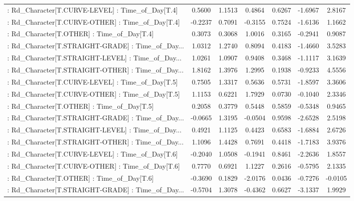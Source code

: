 \begin{longtable}{p{4cm}cccccc}
 : Rd\_Character[T.CURVE-LEVEL] : Time\_of\_Day[T.4]  &  0.5600 &    1.1513 &  0.4864 &       0.6267 & -1.6967 &  2.8167 \\
 : Rd\_Character[T.CURVE-OTHER] : Time\_of\_Day[T.4]  & -0.2237 &    0.7091 & -0.3155 &       0.7524 & -1.6136 &  1.1662 \\
 : Rd\_Character[T.OTHER] : Time\_of\_Day[T.4]        &  0.3073 &    0.3068 &  1.0016 &       0.3165 & -0.2941 &  0.9087 \\
 : Rd\_Character[T.STRAIGHT-GRADE] : Time\_of\_Day... &  1.0312 &    1.2740 &  0.8094 &       0.4183 & -1.4660 &  3.5283 \\
 : Rd\_Character[T.STRAIGHT-LEVEL] : Time\_of\_Day... &  1.0261 &    1.0907 &  0.9408 &       0.3468 & -1.1117 &  3.1639 \\
 : Rd\_Character[T.STRAIGHT-OTHER] : Time\_of\_Day... &  1.8162 &    1.3976 &  1.2995 &       0.1938 & -0.9233 &  4.5556 \\
 : Rd\_Character[T.CURVE-LEVEL] : Time\_of\_Day[T.5]  &  0.7505 &    1.3317 &  0.5636 &       0.5731 & -1.8597 &  3.3606 \\
 : Rd\_Character[T.CURVE-OTHER] : Time\_of\_Day[T.5]  &  1.1153 &    0.6221 &  1.7929 &       0.0730 & -0.1040 &  2.3346 \\
 : Rd\_Character[T.OTHER] : Time\_of\_Day[T.5]        &  0.2058 &    0.3779 &  0.5448 &       0.5859 & -0.5348 &  0.9465 \\
 : Rd\_Character[T.STRAIGHT-GRADE] : Time\_of\_Day... & -0.0665 &    1.3195 & -0.0504 &       0.9598 & -2.6528 &  2.5198 \\
 : Rd\_Character[T.STRAIGHT-LEVEL] : Time\_of\_Day... &  0.4921 &    1.1125 &  0.4423 &       0.6583 & -1.6884 &  2.6726 \\
 : Rd\_Character[T.STRAIGHT-OTHER] : Time\_of\_Day... &  1.1096 &    1.4428 &  0.7691 &       0.4418 & -1.7183 &  3.9376 \\
 : Rd\_Character[T.CURVE-LEVEL] : Time\_of\_Day[T.6]  & -0.2040 &    1.0508 & -0.1941 &       0.8461 & -2.2636 &  1.8557 \\
 : Rd\_Character[T.CURVE-OTHER] : Time\_of\_Day[T.6]  &  0.7770 &    0.6921 &  1.1227 &       0.2616 & -0.5795 &  2.1335 \\
 : Rd\_Character[T.OTHER] : Time\_of\_Day[T.6]        & -0.3690 &    0.1829 & -2.0176 &       0.0436 & -0.7276 & -0.0105 \\
 : Rd\_Character[T.STRAIGHT-GRADE] : Time\_of\_Day... & -0.5704 &    1.3078 & -0.4362 &       0.6627 & -3.1337 &  1.9929 \\

\end{longtable}
